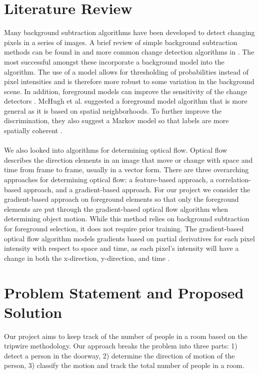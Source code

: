 \documentclass[12pt,oneside]{article} %
\begin{document}
\section{Literature Review}  %
Many background subtraction algorithms have been developed to detect changing pixels in a series of images.
A brief review of simple background subtraction methods can be found in \cite{Piccardi04} and
more common change detection algorithms in \cite{Goyette14}.
The most successful amongst these incorporate a background model into the algorithm. The use of a model
allows for thresholding of probabilities instead of pixel intensities and is therefore more robust to some variation
in the background scene. In addition, foreground models can improve the sensitivity of the change detectors 
\cite{Elgammal02}. McHugh et al. suggested a foreground model algorithm that is more general as it
is based on spatial neighborhoods. To further improve the discrimination, they also suggest a Markov model
so that labels are more spatially coherent
\cite{Mchugh09}.
\\ \\
We also looked into algorithms for determining optical flow. Optical flow describes the direction elements in an image that move or change with space and time from frame to frame, usually in a vector form. There are three overarching approaches for determining optical flow: a feature-based approach, a correlation-based approach, and a gradient-based approach. For our project we consider the gradient-based approach on foreground elements so that only the foreground elements are put through the gradient-based optical flow algorithm when determining object motion. While this method relies on background subtraction for foreground selection, it does not require prior training. The gradient-based optical flow algorithm models gradients based on partial derivatives for each pixel intensity with respect to space and time, as each pixel's intensity will have a change in both the x-direction, y-direction, and time \cite{Smith97}.

\section{Problem Statement and Proposed Solution}  %
Our project aims to keep track of the number of people in a room based on the tripwire methodology. Our approach breaks the problem into three parts: 1) detect a person in the doorway, 2) determine the direction of motion of the person, 3) classify the motion and track the total number of people in a room.
\end{document}
